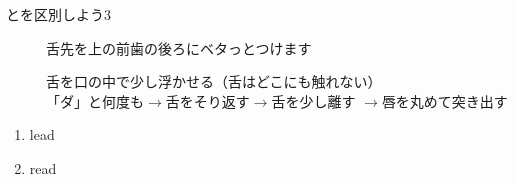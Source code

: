 \documentclass[aspectratio=169,xcolor={dvipsnames,table}]{beamer}
\begin{document}
\begin{frame}[plain]{とを区別しよう3}

\begin{description}
 \item[] 舌先を上の前歯の後ろにベタっとつけます
 \item[] 舌を口の中で少し浮かせる（舌はどこにも触れない）\\
	    「ダ」と何度も$\rightarrow$舌をそり返す$\rightarrow$舌を少し離す%
	    $\rightarrow$唇を丸めて突き出す\end{description}

\Large 

 \begin{enumerate}
  \item lead\hfill{}\hspace{250pt}\mbox{}
  \item read\hfill{}\hspace{250pt}\mbox{}

 \end{enumerate}
\hfill{\scriptsize {}}
\end{frame}
\end{document}
